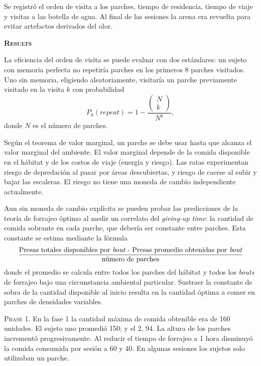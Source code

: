 \documentclass[a4paper,12pt]{article}
\begin{document}
Se registró el orden de visita a los parches, tiempo de residencia, tiempo de viaje y visitas a las botella de agua. Al final de las sesiones la arena era revuelta para evitar artefactos derivados del olor.

{\scshape\bfseries Results}

La eficiencia del orden de visita se puede evaluar con dos estándares: un sujeto con memoria perfecta no repetiría parches en los primeros 8 parches visitados. Uno sin memoria, eligiendo aleatoriamente, visitaría un parche previamente visitado en la visita $k$ con probabilidad
\begin{equation}
	P_{k}(repeat) =
	1 - \frac{
		\left(\begin{array}{l}
			N\\
			k
		\end{array}\right)
	}{
	N^{k}	
	},
\end{equation}
donde $N$ es el número de parches.

Según el teorema de valor marginal, un parche se debe usar hasta que alcanza el valor marginal del ambiente. El valor marginal depende de la comida disponible en el hábitat y de los costos de viaje (energía y riesgo). Las ratas experimentan riesgo de depredación al pasar por áreas descubiertas, y riesgo de caerse al subir y bajar las escaleras. El riesgo no tiene una moneda de cambio independiente actualmente. 

Aun sin moneda de cambio explícita se pueden probar las predicciones de la teoría de forrajeo óptimo al medir un correlato del {\itshape giving-up time}: la cantidad de comida sobrante en cada parche, que debería ser constante entre parches. Esta constante se estima mediante la fórmula
$$
\frac{
	\mbox{Presas totales disponibles por {\itshape bout} - Presas promedio obtenidas por {\itshape bout}}
}{
	\mbox{número de parches}
}
$$
donde el promedio se calcula entre todos los parches del hábitat y todos los {\itshape bouts} de forrajeo bajo una circunstancia ambiental particular. Sustraer la constante de sobra de la cantidad disponible al inicio resulta en la cantidad óptima a comer en parches de densidades variables.

{\scshape Phase 1.} En la fase 1 la cantidad máxima de comida obtenible era de 160 unidades. El sujeto uno promedió 150; y el 2, 94. La altura de los parches incrementó progresivamente. Al reducir el tiempo de forrajeo a 1 hora disminuyó la comida consumida por sesión a 60 y 40. En algunas sesiones los sujetos solo utilizaban un parche.
\end{document}
